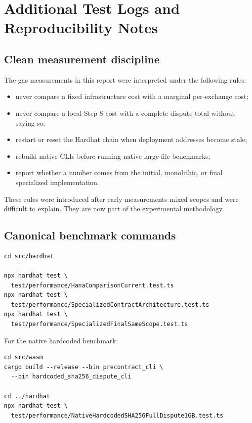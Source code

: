 \chapter[Additional Reproducibility Notes]{Additional Test Logs and Reproducibility Notes}
\label{app:reproducibility-notes}

\section{Clean measurement discipline}

The gas measurements in this report were interpreted under the following rules:

\begin{itemize}
  \item never compare a fixed infrastructure cost with a marginal per-exchange cost;
  \item never compare a local Step 8 cost with a complete dispute total without saying so;
  \item restart or reset the Hardhat chain when deployment addresses become stale;
  \item rebuild native CLIs before running native large-file benchmarks;
  \item report whether a number comes from the initial, monolithic, or final specialized
  implementation.
\end{itemize}

These rules were introduced after early measurements mixed scopes and were difficult to
explain. They are now part of the experimental methodology.

\section{Canonical benchmark commands}

\begin{verbatim}
cd src/hardhat

npx hardhat test \
  test/performance/HanaComparisonCurrent.test.ts
npx hardhat test \
  test/performance/SpecializedContractArchitecture.test.ts
npx hardhat test \
  test/performance/SpecializedFinalSameScope.test.ts
\end{verbatim}

For the native hardcoded benchmark:

\begin{verbatim}
cd src/wasm
cargo build --release --bin precontract_cli \
  --bin hardcoded_sha256_dispute_cli

cd ../hardhat
npx hardhat test \
  test/performance/NativeHardcodedSHA256FullDispute1GB.test.ts
\end{verbatim}

